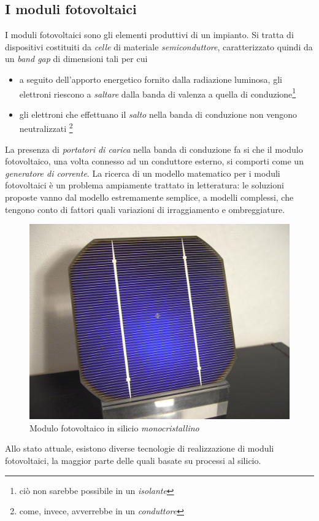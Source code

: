 %
\subsection{I moduli fotovoltaici}
I moduli fotovoltaici sono gli elementi produttivi di un impianto. 
Si tratta di dispositivi costituiti da \emph{celle} di materiale 
\emph{semiconduttore}, caratterizzato quindi da un \emph{band gap} 
di dimensioni tali per cui 
%
\begin{itemize}
\item a seguito dell'apporto energetico fornito dalla radiazione luminosa, 
      gli elettroni riescono a \emph{saltare} dalla banda di valenza a 
      quella di conduzione\footnote{ci\`o non sarebbe possibile in un \emph{isolante}}
%
\item gli elettroni che effettuano il \emph{salto} nella banda di conduzione 
      non vengono neutralizzati
      \footnote{come, invece, avverrebbe in un \emph{conduttore}}
\end{itemize}
%
La presenza di \emph{portatori di carica} nella banda di conduzione 
fa si che il modulo fotovoltaico, una volta connesso ad un conduttore 
esterno, si comporti come un \emph{generatore di corrente}\cite{castaner02}.
%
La ricerca di un modello matematico per i moduli fotovoltaici \`e un problema 
ampiamente trattato in letteratura: le soluzioni proposte vanno dal modello 
estremamente semplice\cite{bellini09}, a modelli complessi, 
che tengono conto di fattori quali variazioni di irraggiamento e 
ombreggiature\cite{patel08}.

%
\begin{figure}[!h]
\centering
\includegraphics[width=350pt]{img/modulo-fotovoltaico.jpg}
\caption{Modulo fotovoltaico in silicio \emph{monocristallino}}
\end{figure}
%
Allo stato attuale, esistono diverse tecnologie di realizzazione di 
moduli fotovoltaici, la maggior parte delle quali basate su processi 
al silicio.
%

